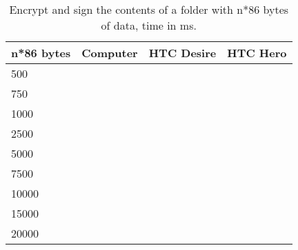 \begin{table}
  \centering
  \caption{Encrypt and sign the contents of a folder with n*86 bytes of data, time in ms.}
  \begin{tabular}{ | l | l | l | l |}
    \hline
    \textbf{n*86 bytes} & \textbf{Computer} & \textbf{HTC Desire} & \textbf{HTC Hero} \\ \hline
    500     &   &   & \\ \hline
    750     &   &   & \\ \hline
    1000    &   &   & \\ \hline
    2500    &   &   & \\ \hline     
    5000    &   &   & \\ \hline 
    7500    &   &   & \\ \hline 
    10000   &   &   & \\ \hline 
    15000   &   &   & \\ \hline 
    20000   &   &   & \\ \hline 
  \end{tabular}
  \label{tbl:folder:encryptsign}
\end{table}
